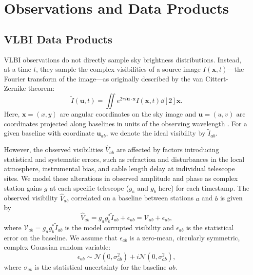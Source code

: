 \documentclass[linenumbers, twocolumn, tighten]{aastex701}
\begin{document}
\section{Observations and Data Products} \label{sec:observations}

\subsection{VLBI Data Products} \label{subsec:dataprods}

VLBI observations do not directly sample sky brightness distributions. Instead, at a time $t$, they sample the complex visibilities of a source image $I(\boldsymbol{x},t)$---the Fourier transform of the image---as originally described by the van Cittert-Zernike theorem:
\begin{equation}
    \tilde{I}(\boldsymbol{u}, t) = \iint e^{2\pi i \boldsymbol{u} \cdot \boldsymbol{x}} I(\boldsymbol{x},t) \dd[2]{\boldsymbol{x}}.
\end{equation}
Here, $\boldsymbol{x} = (x,y)$ are angular coordinates on the sky image and $\boldsymbol{u} = (u,v)$ are coordinates projected along baselines in units of the observing wavelength \citep{2017isra.book.....T}. For a given baseline with coordinate $\bm{u}_{ab}$, we denote the ideal visibility by $\tilde{I}_{ab}$. 

However, the observed visibilities $\hat{V}_{ab}$ are affected by factors introducing statistical and systematic errors, such as refraction and disturbances in the local atmosphere, instrumental bias, and cable length delay at individual telescope sites. We model these alterations in observed amplitude and phase as complex station gains $g$ at each specific telescope ($g_a$ and $g_b$ here) for each timestamp. The observed visibility $\hat{V}_{ab}$ correlated on a baseline between stations $a$ and $b$ is given by
\begin{equation}\label{eq:vis_obs}
    \hat{V}_{ab} = g_ag_b^*\tilde{I}_{ab} + \epsilon_{ab} = \mathcal{V}_{ab} + \epsilon_{ab},
\end{equation}
where $\mathcal{V}_{ab} = g_a g_b^* \tilde{I}_{ab}$ is the model corrupted visibility and $\epsilon_{ab}$ is the statistical error on the baseline. We assume that $\epsilon_{ab}$ is a zero-mean, circularly symmetric, complex Gaussian random variable:
\begin{equation}\label{eq:vis_noise}
    \epsilon_{ab} \sim \mathcal{N}(0,\sigma_{ab}^2)+i\mathcal{N}(0,\sigma_{ab}^2),
\end{equation}
where $\sigma_{ab}$ is the statistical uncertainty for the baseline $ab$. 
\end{document}
